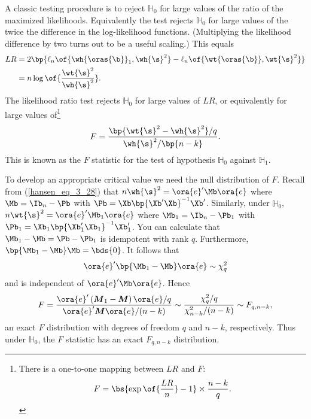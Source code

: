 A classic testing procedure is to reject $\mathbb{H}_0$ for large values of the ratio of the maximized likelihoods. Equivalently the test rejects $\mathbb{H}_0$ for large values of the twice the difference in the log-likelihood functions. (Multiplying the likelihood difference by two turns out to be a useful scaling.) This equals
\begin{equation}
    \label{hansen_eq_5_18}
    \begin{aligned}
        LR & = 2 \bp{\ell_n\of{\wh{\oras{\b}}_1, \wh{\s}^2} - \ell_n\of{\wt{\oras{\b}}, \wt{\s}^2}} \\
        & = n \log \of{\frac{\wt{\s}^2}{\wh{\s}^2}}.
    \end{aligned}
\end{equation}
The likelihood ratio test rejects $\mathbb{H}_0$ for large values of $LR$, or equivalently for large values of\footnote{There is a one-to-one mapping between $LR$ and $F$:
\begin{equation}
    \notag 
    F = \bs{\exp\of{\frac{LR}{n}} - 1} \times \frac{n-k}{q}.
\end{equation}
}
\begin{equation}
    \label{hansen_eq_5_19}
    F = \frac{\bp{\wt{\s}^2 - \wh{\s}^2} / q}{\wh{\s}^2/\bp{n-k}}.
\end{equation}
This is known as the $F$ statistic for the test of hypothesis $\mathbb{H}_0$ against $\mathbb{H}_1$.

To develop an appropriate critical value we need the null distribution of $F$. Recall from (\ref{hansen_eq_3_28}) that $n \wh{\s}^2 = \ora{e}^{\prime} \Mb \ora{e}$ where $\Mb = \Ib_n - \Pb$ with $\Pb = \Xb \bp{\Xb^{\prime} \Xb}^{-1}\Xb^{\prime}$. Similarly, under $\mathbb{H}_0$, $n \wt{\s}^2 = \ora{e}^{\prime} \Mb_1 \ora{e}$ where $\Mb_1 = \Ib_n - \Pb_1$ with $\Pb_1 = \Xb_1 \bp{\Xb_1^{\prime} \Xb_1}^{-1}\Xb_1^{\prime}$. You can calculate that $\Mb_1 - \Mb = \Pb - \Pb_1$ is idempotent with rank $q$. Furthermore, $\bp{\Mb_1 - \Mb} \Mb = \bds{0}$. It follows that 
$$\ora{e}^{\prime} \bp{\Mb_1 - \Mb} \ora{e} \sim \chi_q^2$$
and is independent of $\ora{e}^{\prime}\Mb\ora{e}$. Hence 
\begin{equation}
    \notag
    F=\frac{\ora{e}^{\prime}\left(\boldsymbol{M}_1-\boldsymbol{M}\right) \ora{e} / q}{\ora{e}^{\prime} \boldsymbol{M} \ora{e} /(n-k)} \sim \frac{\chi_q^2 / q}{\chi_{n-k}^2 /(n-k)} \sim F_{q, n-k},
\end{equation}
an exact $F$ distribution with degrees of freedom $q$ and $n-k$, respectively. Thus under $\mathbb{H}_0$, the $F$ statistic has an exact $F_{q, n-k}$ distribution.

